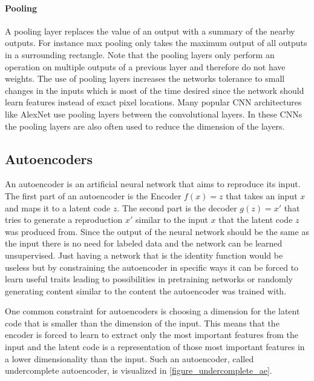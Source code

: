 \paragraph{Pooling}
A pooling layer replaces the value of an output with a summary of the nearby outputs. For instance
max pooling only takes the maximum output of all outputs in a surrounding rectangle. Note that
the pooling layers only perform an operation on multiple outputs of a previous layer and therefore
do not have weights. The use of pooling layers increases the networks tolerance to small changes in
the inputs \parencite{2016-goodfellow-deep} which is most of the time desired since the network should
learn features instead of exact pixel locations. Many popular CNN architectures like 
AlexNet \parencite{2012-krizhevsky-imagenet} use pooling layers between the convolutional layers.
In these CNNs the pooling layers are also often used to reduce the dimension of the layers.




\subsection{Autoencoders}

An autoencoder is an artificial neural network that aims to reproduce its input. The first part
of an autoencoder is the Encoder $f(x)=z$ that takes an input $x$ and maps it to a latent code $z$.
The second part is the decoder $g(z)=x'$ that tries to generate a reproduction $x'$ similar to the
input $x$ that the latent code $z$ was produced from. Since the output of the neural network should
be the same as the input there is no need for labeled data and the network can be learned unsupervised.
Just having a network that is the identity function would be useless but by constraining the autoencoder
in specific ways it can be forced to learn useful traits leading to possibilities in pretraining 
networks or randomly generating content similar to the content the autoencoder was trained with.

One common constraint for autoencoders is choosing a dimension for the latent code that is smaller
than the dimension of the input. This means that the encoder is forced to learn to extract only the
most important features from the input and the latent code is a representation of those most
important features in a lower dimensionality than the input. Such an autoencoder, called
undercomplete autoencoder, is visualized in \autoref{figure_undercomplete_ae}.

